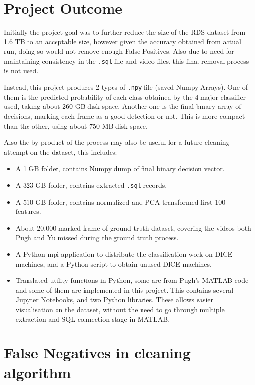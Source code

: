 \documentclass[bsc,logo,twoside,fullspacing,parskip]{infthesis}
\begin{document}
\section{Project Outcome}

Initially the project goal was to further reduce the size of the RDS dataset from 1.6 TB to an acceptable size, however given the accuracy obtained from actual run, doing so would not remove enough False Positives. Also due to need for maintaining consistency in the {\tt .sql} file and video files, this final removal process is not used.

Instead, this project produces 2 types of {\tt .npy} file (saved Numpy Arrays). 
One of them is the predicted probability of each class obtained by the 4 major classifier used, taking about 260 GB disk space. 
Another one is the final binary array of decisions, marking each frame as a good detection or not. 
This is more compact than the other, using about 750 MB disk space.

Also the by-product of the process may also be useful for a future cleaning attempt on the dataset, this includes:
\begin{itemize}
\setlength{\parskip}{3pt}
\item A 1 GB folder, contains Numpy dump of final binary decision vector.
\item A 323 GB folder, contains extracted {\tt .sql} records.
\item A 510 GB folder, contains normalized and PCA transformed first 100 features.
\item About 20,000 marked frame of ground truth dataset, covering the videos both Pugh and Yu missed during the ground truth process.
\item A Python mpi application to distribute the classification work on DICE machines, and a Python script to obtain unused DICE machines.
\item Translated utility functions in Python, some are from Pugh's MATLAB code and some of them are implemented in this project. 
This contains several Jupyter Notebooks, and two Python libraries. 
These allows easier visualisation on the dataset, without the need to go through multiple extraction and SQL connection stage in MATLAB. 
\end{itemize}

\section{False Negatives in cleaning algorithm}
\label{sec:falsenegative}
\label{sec:feiffault}
\label{sec:svmfault}
\end{document}
